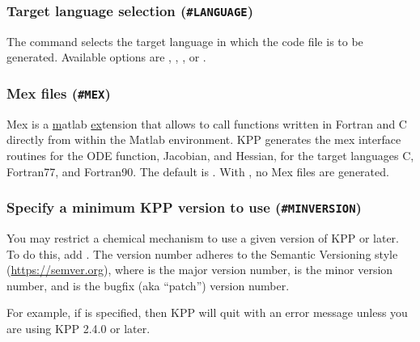 \documentclass[twoside]{article}
\begin{document}
\subsubsection{Target language selection ({\tt\#LANGUAGE})}
\label{sec:command-language}

The  command selects the target language in which the
code file is to be generated. Available options are ,
, , or .

\subsubsection{Mex files ({\tt\#MEX})}
\label{sec:command-mex}

Mex is a \underline{m}atlab \underline{ex}tension that allows to call
functions written in Fortran and C directly from within the Matlab
environment. KPP generates the mex interface routines for the ODE
function, Jacobian, and Hessian, for the target languages C, Fortran77,
and Fortran90.  The default is . With , no Mex files
are generated.

\subsubsection{Specify a minimum KPP version to use ({\tt\#MINVERSION})}
\label{sec:command-minversion}

You may restrict a chemical mechanism to use a given version of KPP or
later. To do this, add . The version number
 adheres to the Semantic Versioning style
(\url{https://semver.org}), where  is the major version number,
 is the minor version number, and  is the bugfix (aka
``patch'') version number.

For example, if  is specified, then KPP will
quit with an error message unless you are using KPP 2.4.0 or later.

\end{document}
